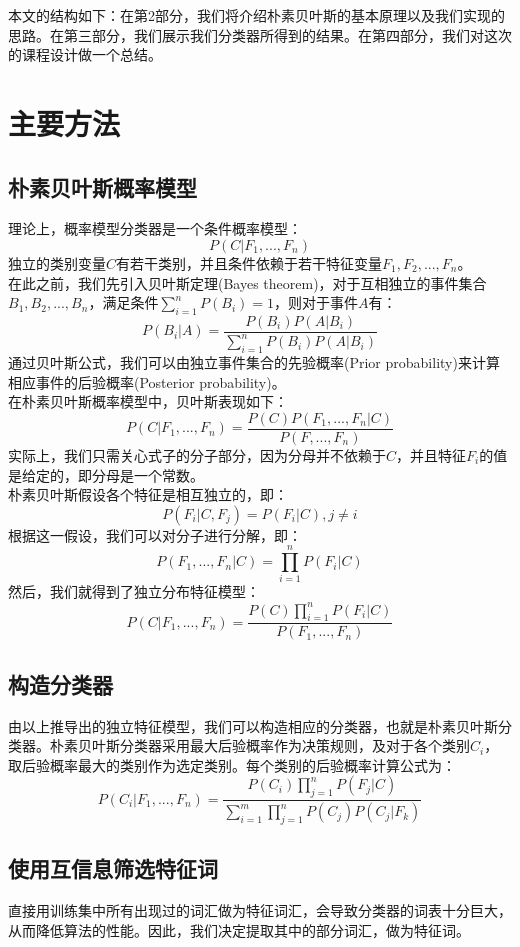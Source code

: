 \documentclass[a4paper, twocolumn, 12pt]{article}
\begin{document}
本文的结构如下：在第2部分，我们将介绍朴素贝叶斯的基本原理以及我们实现的思路。在第三部分，我们展示我们分类器所得到的结果。在第四部分，我们对这次的课程设计做一个总结。

\section{主要方法}
\subsection{朴素贝叶斯概率模型}
理论上，概率模型分类器是一个条件概率模型：
\[ P(C|F_1, ..., F_n) \]
独立的类别变量$C$有若干类别，并且条件依赖于若干特征变量$F_1, F_2, ..., F_n$。\\

在此之前，我们先引入贝叶斯定理(Bayes theorem)，对于互相独立的事件集合${B_1, B_2, ..., B_n}$，满足条件$\sum_{i=1}^n P(B_i)=1$，则对于事件$A$有：
\[P(B_i|A)=\frac{P(B_i)P(A|B_i)}{\sum_{i=1}^n P(B_i)P(A|B_i)}\]
通过贝叶斯公式，我们可以由独立事件集合的先验概率(Prior probability)来计算相应事件的后验概率(Posterior probability)。\\

在朴素贝叶斯概率模型中，贝叶斯表现如下：
\[P(C|F_1, ..., F_n)=\frac{P(C)P(F_1, ..., F_n|C)}{P(F, ..., F_n)}\]
实际上，我们只需关心式子的分子部分，因为分母并不依赖于$C$，并且特征$F_i$的值是给定的，即分母是一个常数。\\

朴素贝叶斯假设各个特征是相互独立的，即：
\[P(F_i|C, F_j)=P(F_i|C), j \neq i\]
根据这一假设，我们可以对分子进行分解，即：
\[P(F_1, ..., F_n|C)=\prod_{i=1}^nP(F_i|C)\]
然后，我们就得到了独立分布特征模型：
\[P(C|F_1, ..., F_n)=\frac{P(C)\prod_{i=1}^n P(F_i|C)}{P(F_1, ..., F_n)}\]
\subsection{构造分类器}
由以上推导出的独立特征模型，我们可以构造相应的分类器，也就是朴素贝叶斯分类器。朴素贝叶斯分类器采用最大后验概率作为决策规则，及对于各个类别$C_i$，取后验概率最大的类别作为选定类别。每个类别的后验概率计算公式为：
\[P(C_i|F_1, ..., F_n)=\frac{P(C_i)\prod_{j=1}^nP(F_j|C)}{\sum_{i=1}^m \prod_{j=1}^nP(C_j)P(C_j|F_k)}\]

\subsection{使用互信息筛选特征词}
直接用训练集中所有出现过的词汇做为特征词汇，会导致分类器的词表十分巨大，从而降低算法的性能。因此，我们决定提取其中的部分词汇，做为特征词。\\
\end{document}
